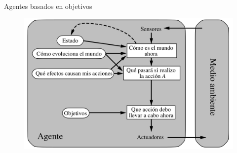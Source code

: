 \begin{frame}{Agentes basados en objetivos}
    \begin{figure}
        \includegraphics[scale=0.27]{24_chap2_pag24.png}
    \end{figure}
\end{frame}{}
